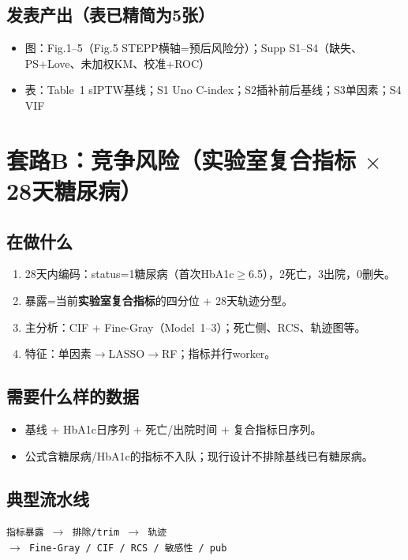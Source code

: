 \documentclass[11pt,a4paper]{article}
\begin{document}
\subsection{发表产出（表已精简为5张）}
\begin{itemize}
  \item 图：Fig.1--5（Fig.5 STEPP横轴=预后风险分）；Supp S1--S4（缺失、PS+Love、未加权KM、校准+ROC）
  \item 表：Table~1 sIPTW基线；S1 Uno C-index；S2插补前后基线；S3单因素；S4 VIF
\end{itemize}

\section{套路B：竞争风险（实验室复合指标 $\times$ 28天糖尿病）}

\subsection{在做什么}
\begin{enumerate}
  \item 28天内编码：status=1糖尿病（首次HbA1c$\geq$6.5），2死亡，3出院，0删失。
  \item 暴露=当前\textbf{实验室复合指标}的四分位 + 28天轨迹分型。
  \item 主分析：CIF + Fine-Gray（Model~1--3）；死亡侧、RCS、轨迹图等。
  \item 特征：单因素$\rightarrow$LASSO$\rightarrow$RF；指标并行worker。
\end{enumerate}

\subsection{需要什么样的数据}
\begin{itemize}
  \item 基线 + HbA1c日序列 + 死亡/出院时间 + 复合指标日序列。
  \item 公式含糖尿病/HbA1c的指标不入队；现行设计不排除基线已有糖尿病。
\end{itemize}

\subsection{典型流水线}
\begin{center}
\small
\texttt{指标暴露 $\rightarrow$ 排除/trim $\rightarrow$ 轨迹}\\
\texttt{$\rightarrow$ Fine-Gray / CIF / RCS / 敏感性 / pub}
\end{center}
\end{document}
